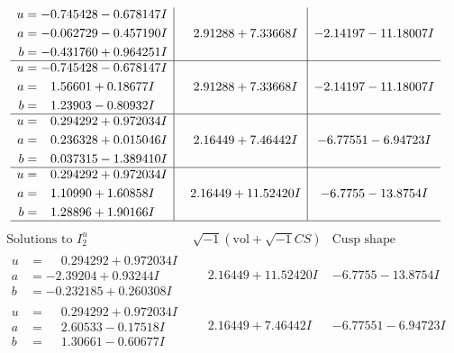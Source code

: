 \documentclass[1p]{elsarticle_modified}
\theoremstyle{definition}
\newcommand{\I}{\sqrt{-1}}
\begin{document}
$$\begin{array}{c|c|c}
\begin{aligned}
u &= -0.745428 - 0.678147 I \\
a &= -0.062729 - 0.457190 I \\
b &= -0.431760 + 0.964251 I\end{aligned}
 & \phantom{-}2.91288 + 7.33668 I & -2.14197 - 11.18007 I \\ \hline\begin{aligned}
u &= -0.745428 - 0.678147 I \\
a &= \phantom{-}1.56601 + 0.18677 I \\
b &= \phantom{-}1.23903 - 0.80932 I\end{aligned}
 & \phantom{-}2.91288 + 7.33668 I & -2.14197 - 11.18007 I \\ \hline\begin{aligned}
u &= \phantom{-}0.294292 + 0.972034 I \\
a &= \phantom{-}0.236328 + 0.015046 I \\
b &= \phantom{-}0.037315 - 1.389410 I\end{aligned}
 & \phantom{-}2.16449 + 7.46442 I & -6.77551 - 6.94723 I \\ \hline\begin{aligned}
u &= \phantom{-}0.294292 + 0.972034 I \\
a &= \phantom{-}1.10990 + 1.60858 I \\
b &= \phantom{-}1.28896 + 1.90166 I\end{aligned}
 & \phantom{-}2.16449 + 11.52420 I & -6.7755 - 13.8754 I\\
 \hline 
 \end{array}$$\newpage$$\begin{array}{c|c|c}  
\text{Solutions to }I^u_{2}& \I (\text{vol} + \sqrt{-1}CS) & \text{Cusp shape}\\
 \hline 
\begin{aligned}
u &= \phantom{-}0.294292 + 0.972034 I \\
a &= -2.39204 + 0.93244 I \\
b &= -0.232185 + 0.260308 I\end{aligned}
 & \phantom{-}2.16449 + 11.52420 I & -6.7755 - 13.8754 I \\ \hline\begin{aligned}
u &= \phantom{-}0.294292 + 0.972034 I \\
a &= \phantom{-}2.60533 - 0.17518 I \\
b &= \phantom{-}1.30661 - 0.60677 I\end{aligned}
 & \phantom{-}2.16449 + 7.46442 I & -6.77551 - 6.94723 I \\ \hline\begin{aligned}

\end{aligned}
\end{array}$$
\end{document}
